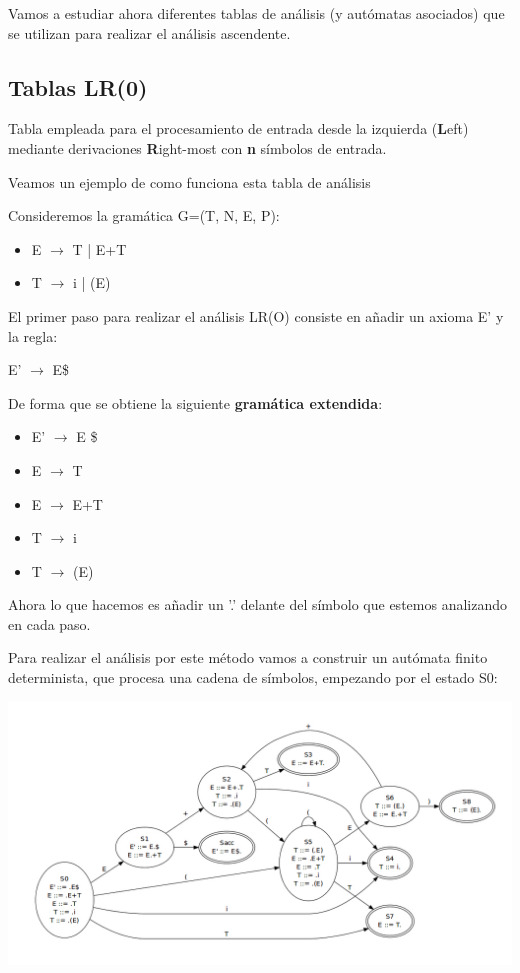 \documentclass{apuntes}
\begin{document}
Vamos a estudiar ahora diferentes tablas de análisis (y autómatas asociados) que se utilizan para realizar el análisis ascendente.

\subsection{Tablas LR(0)}

\begin{defn}[Tabla LR(n)]
Tabla empleada para el procesamiento de entrada desde la izquierda (\textbf{L}eft) mediante derivaciones \textbf{R}ight-most con \textbf{n} símbolos de entrada.

\end{defn}

Veamos un ejemplo de como funciona esta tabla de análisis
\begin{example}
Consideremos la gramática G=(T, N, E, P):
\begin{itemize}
\item E $\rightarrow$ T | E+T
\item T $\rightarrow$ i | (E)
\end{itemize}

El primer paso para realizar el análisis LR(O) consiste en añadir un axioma E' y la regla:
\begin{center}
E' $\rightarrow$ E\$
\end{center}

De forma que se obtiene la siguiente \textbf{gramática extendida}:
\begin{itemize}
\item E' $\rightarrow$ E \$
\item E $\rightarrow$ T
\item E $\rightarrow$ E+T
\item T $\rightarrow$ i
\item T $\rightarrow$ (E)
\end{itemize}

Ahora lo que hacemos es añadir un '.' delante del símbolo que estemos analizando en cada paso.

Para realizar el análisis por este método vamos a construir un autómata finito determinista, que procesa una cadena de símbolos, empezando por el estado S0:

\begin{center}
\includegraphics[scale=0.45]{img/automatalr0.jpg}
\end{center}


\end{example}
\end{document}

